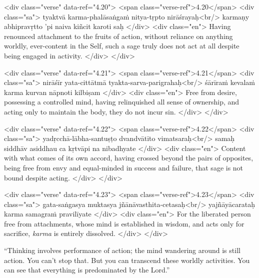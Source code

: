 \begin{html}
<div class="verse" data-ref="4.20">
  <span class="verse-ref">4.20</span>
  <div class="sa">
    tyaktvā karma-phalāsaṅgaṁ nitya-tṛpto nirāśrayaḥ<br/>
    karmaṇy abhipravṛtto ’pi naiva kiñcit karoti saḥ
  </div>
  <div class="en">
    Having renounced attachment to the fruits of action, without reliance on anything worldly, ever-content in the Self, such a sage truly does not act at all despite being engaged in activity.
  </div>
</div>
\end{html}



\begin{html}
<div class="verse" data-ref="4.21">
  <span class="verse-ref">4.21</span>
  <div class="sa">
    nirāśīr yata-cittātmā tyakta-sarva-parigrahaḥ<br/>
    śārīraṁ kevalaṁ karma kurvan nāpnoti kilbiṣam
  </div>
  <div class="en">
    Free from desire, possessing a controlled mind, having relinquished all sense of ownership, and acting only to maintain the body, they do not incur sin.
  </div>
</div>
\end{html}



\begin{html}
<div class="verse" data-ref="4.22">
  <span class="verse-ref">4.22</span>
  <div class="sa">
    yadṛcchā-lābha-santuṣṭo dvandvātīto vimatsaraḥ<br/>
    samaḥ siddhāv asiddhau ca kṛtvāpi na nibadhyate
  </div>
  <div class="en">
    Content with what comes of its own accord, having crossed beyond the pairs of opposites, being free from envy and equal-minded in success and failure, that sage is not bound despite acting.
  </div>
</div>
\end{html}



\begin{html}
<div class="verse" data-ref="4.23">
  <span class="verse-ref">4.23</span>
  <div class="sa">
    gata-saṅgasya muktasya jñānāvasthita-cetasaḥ<br/>
    yajñāyācarataḥ karma samagraṁ pravilīyate
  </div>
  <div class="en">
    For the liberated person free from attachments, whose mind is established in wisdom, and acts only for sacrifice, \textit{karma} is entirely dissolved.
  </div>
</div>
\end{html}


\enquote{Thinking involves performance of action; the mind wandering around is still action. You can’t stop that. But you can transcend these worldly activities. You can see that everything is predominated by the Lord.}

